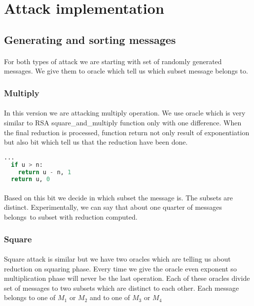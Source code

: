 \documentclass[thesis=B,english]{FITthesis}[2012/10/20]
\begin{document}
{\section{Attack implementation}

\subsection{Generating and sorting messages}
\paragraph*{}{ 
For both types of attack we are starting with set of randomly generated messages. We give them to oracle which tell us which subset message belongs to.

}

\subsubsection{Multiply}
\paragraph*{}{
In this version we are attacking multiply operation. We use oracle which is very similar to RSA square\_and\_multiply function only with one difference.
When the final reduction is processed, function return not only result of exponentiation but also bit which tell us that the reduction have been done.}

\begin{lstlisting}[language=Python]
  ...
  if u > n:
    return u - n, 1
  return u, 0
\end{lstlisting}

\paragraph*{}
{
Based on this bit we decide in which subset the message is. The subsets are distinct. Experimentally, we can say that about one quarter of messages belongs~to
subset with reduction computed.
}
\subsubsection{Square}
\paragraph*{}{
Square attack is similar but we have two oracles which are telling us about reduction on squaring phase. Every time we give the oracle even exponent so 
multiplication phase will never be the last operation. Each of these oracles divide set of messages to two subsets which are distinct to each other. Each message 
belongs to one of \(M_1\) or \(M_2\) and to one of \(M_3\) or \(M_4\)
}

}
\end{document}
